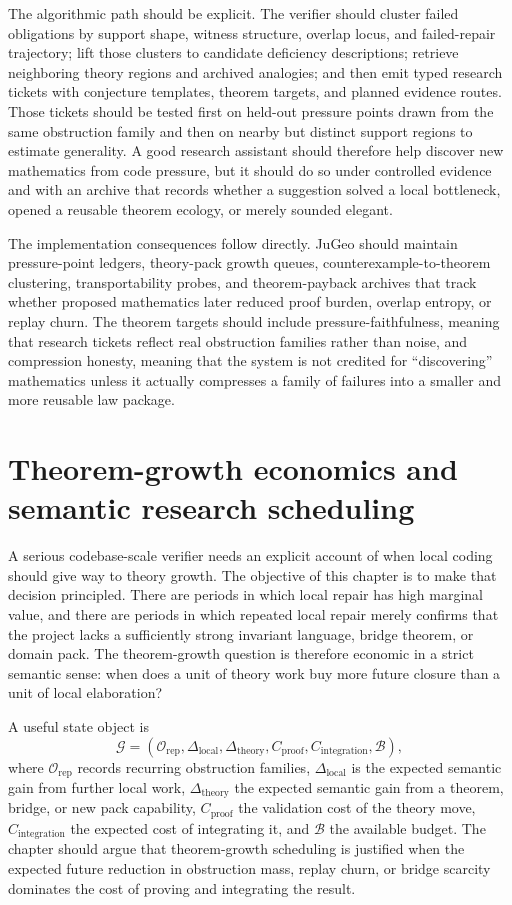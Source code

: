 \documentclass[11pt]{report}
\begin{document}
The algorithmic path should be explicit. The verifier should cluster failed obligations by support shape, witness structure, overlap locus, and failed-repair trajectory; lift those clusters to candidate deficiency descriptions; retrieve neighboring theory regions and archived analogies; and then emit typed research tickets with conjecture templates, theorem targets, and planned evidence routes. Those tickets should be tested first on held-out pressure points drawn from the same obstruction family and then on nearby but distinct support regions to estimate generality. A good research assistant should therefore help discover new mathematics from code pressure, but it should do so under controlled evidence and with an archive that records whether a suggestion solved a local bottleneck, opened a reusable theorem ecology, or merely sounded elegant.

The implementation consequences follow directly. JuGeo should maintain pressure-point ledgers, theory-pack growth queues, counterexample-to-theorem clustering, transportability probes, and theorem-payback archives that track whether proposed mathematics later reduced proof burden, overlap entropy, or replay churn. The theorem targets should include pressure-faithfulness, meaning that research tickets reflect real obstruction families rather than noise, and compression honesty, meaning that the system is not credited for ``discovering'' mathematics unless it actually compresses a family of failures into a smaller and more reusable law package.

\chapter{Theorem-growth economics and semantic research scheduling}
A serious codebase-scale verifier needs an explicit account of when local coding should give way to theory growth. The objective of this chapter is to make that decision principled. There are periods in which local repair has high marginal value, and there are periods in which repeated local repair merely confirms that the project lacks a sufficiently strong invariant language, bridge theorem, or domain pack. The theorem-growth question is therefore economic in a strict semantic sense: when does a unit of theory work buy more future closure than a unit of local elaboration?

A useful state object is
\[
\mathcal{G} = (\mathcal{O}_{\mathrm{rep}}, \Delta_{\mathrm{local}}, \Delta_{\mathrm{theory}}, C_{\mathrm{proof}}, C_{\mathrm{integration}}, \mathcal{B}),
\]
where $\mathcal{O}_{\mathrm{rep}}$ records recurring obstruction families, $\Delta_{\mathrm{local}}$ is the expected semantic gain from further local work, $\Delta_{\mathrm{theory}}$ the expected semantic gain from a theorem, bridge, or new pack capability, $C_{\mathrm{proof}}$ the validation cost of the theory move, $C_{\mathrm{integration}}$ the expected cost of integrating it, and $\mathcal{B}$ the available budget. The chapter should argue that theorem-growth scheduling is justified when the expected future reduction in obstruction mass, replay churn, or bridge scarcity dominates the cost of proving and integrating the result.
\end{document}
